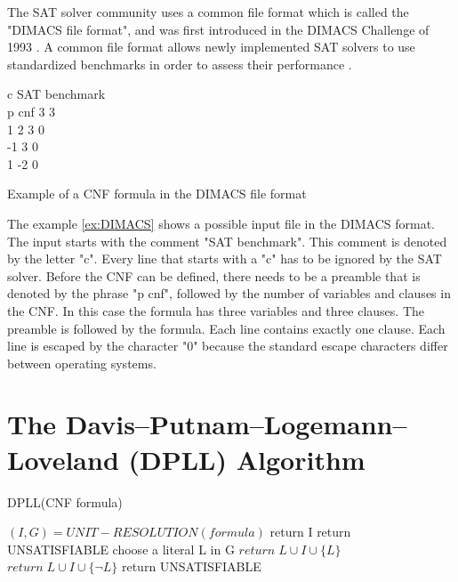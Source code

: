 The SAT solver community uses a common file format which is called the "DIMACS file format", and was first introduced in the DIMACS Challenge of 1993 \cite{johnson1996cliques}. A common file format allows newly implemented SAT solvers to use standardized benchmarks in order to assess their performance \cite{biere2009handbook}.

\begin{example}
\begin{leftbar}
\centering
c SAT benchmark\\
p cnf 3 3\\
1 2 3 0\\
-1 3 0\\
1 -2 0
\end{leftbar}
\caption{Example of a CNF formula in the DIMACS file format}
\label{ex:DIMACS}
\end{example}

The example \ref{ex:DIMACS} shows a possible input file in the DIMACS format. The input starts with the comment "SAT benchmark". This comment is denoted by the letter "c". Every line that starts with a "c" has to be ignored by the SAT solver. Before the CNF can be defined, there needs to be a preamble that is denoted by the phrase "p cnf", followed by the number of variables and clauses in the CNF. In this case the formula has three variables and three clauses. The preamble is followed by the formula. Each line contains exactly one clause. Each line is escaped by the character "0" because the standard escape characters differ between operating systems.

\section{The Davis–Putnam–Logemann–Loveland (DPLL) Algorithm}

\begin{algorithm}
\caption{DPLL(CNF formula) \cite{biere2009handbook}}\label{alg:DPLL}
\begin{algorithmic}
\State $(I,G) = UNIT-RESOLUTION(formula)$
	\State return I
    \State return UNSATISFIABLE
\Else
	\State choose a literal L in G
		\State $return \; L \cup I \cup \{L\}$
		\State $return \; L \cup I \cup \{\neg L\}$
	\Else
		\State return UNSATISFIABLE
	\EndIf
\EndIf
\end{algorithmic}
\end{algorithm}


